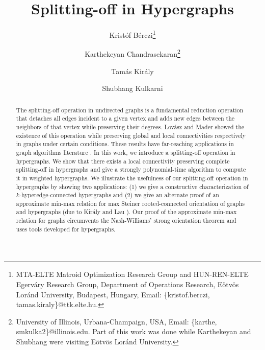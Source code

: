\documentclass{article}
\title{Splitting-off in Hypergraphs}
\author{
Krist\'{o}f B\'{e}rczi\thanks{MTA-ELTE Matroid Optimization Research Group and HUN-REN-ELTE Egerv\'{a}ry Research Group, Department of Operations Research, E\"{o}tv\"{o}s Lor\'{a}nd
University, Budapest, Hungary, Email: \{kristof.berczi, tamas.kiraly\}@ttk.elte.hu.}
\and Karthekeyan Chandrasekaran\thanks{University of Illinois, Urbana-Champaign, USA, Email: \{karthe, smkulka2\}@illinois.edu. 
Part of this work was done while Karthekeyan and Shubhang were visiting E\"{o}tv\"{o}s Lor\'{a}nd
University.}
\and Tam\'{a}s Kir\'{a}ly\footnotemark[1]
\and Shubhang Kulkarni\footnotemark[2]
}
\date{}
\begin{document}
\maketitle
\begin{abstract}
The splitting-off operation in undirected graphs is a fundamental reduction operation that detaches all edges incident to a given vertex and adds new edges between the neighbors of that vertex while preserving their degrees. Lov\'{a}sz \cite{Lov74, Lovasz-problems-book} and Mader \cite{Mad78} showed the existence of this operation while preserving global and local connectivities respectively in graphs under certain conditions. These results have far-reaching applications in graph algorithms literature \cite{Lov76, Mad78, Frank93:Applications-of-submod-functions, FK02, Kiraly-Lau, Fra92, GB93, Fra94, JFJ95, Frank-book, nagamochi_ibaraki_2008_book, NNI97, HW96, Goe01, Jor03, Kri03, JMS03, CFLY11, BHTP03, Lau07, CS08, NZ20, BN23}. 
In this work, we introduce a splitting-off operation in hypergraphs. We show that there exists a local connectivity preserving complete splitting-off in hypergraphs and give a strongly polynomial-time algorithm to compute it in weighted hypergraphs. We illustrate the usefulness of our splitting-off operation in hypergraphs by showing two applications: (1) we give a constructive characterization of $k$-hyperedge-connected hypergraphs and (2) we give an alternate proof of an approximate min-max relation for max Steiner rooted-connected orientation of graphs and hypergraphs (due to Kir\'{a}ly and Lau \cite{Kiraly-Lau}). Our proof of the approximate min-max relation for graphs circumvents the Nash-Williams' strong orientation theorem and uses tools developed for hypergraphs.
\end{abstract}

\newpage
\tableofcontents
\newpage

\setcounter{page}{1}
\end{document}
